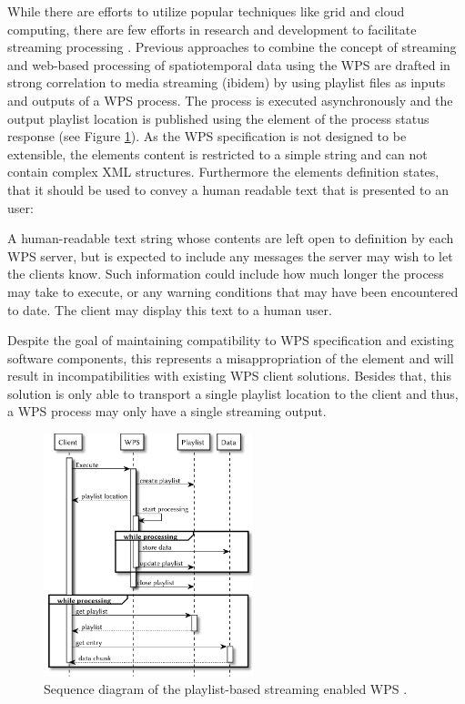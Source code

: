 	While there are efforts to utilize popular techniques like grid and cloud computing, there are few efforts in research and development to facilitate streaming processing \citep{foerster2012live}. Previous approaches to combine the concept of streaming and web-based processing of spatiotemporal data using the \ac{WPS} are drafted in strong correlation to media streaming (ibidem) by using playlist files \citep{ietf:draft-pantos-http-live-streaming-12} as inputs and outputs of a \ac{WPS} process. The process is executed asynchronously and the output playlist location is published using the  element of the process status response (see Figure \ref{fig:sd:previous}). As the \ac{WPS} specification is not designed to be extensible, the elements content is restricted to a simple string and can not contain complex \ac{XML} structures. Furthermore the elements definition states, that it should be used to convey a human readable text that is presented to an user:
	\begin{signedquote}{\citet{ogc:wps}}
		A human-readable text string whose contents are left open to definition by each WPS server, but is expected to include any messages the server may wish to let the clients know. Such information could include how much longer the process may take to execute, or any warning conditions that may have been encountered to date. The client may display this text to a human user.
	\end{signedquote}
	Despite the goal of maintaining compatibility to \ac{WPS} specification and existing software components, this represents a misappropriation of the element and will result in incompatibilities with existing \ac{WPS} client solutions. Besides that, this solution is only able to transport a single playlist location to the client and thus, a \ac{WPS} process may only have a single streaming output.

	\begin{figure}[!htb]
		\centering
		\includegraphics[width=0.54225352112676062\textwidth]{figures/sequence-diagramm-previous.pdf}
		\caption{\label{fig:sd:previous}Sequence diagram of the playlist-based streaming enabled WPS \citep{foerster2012live}.}
	\end{figure}

